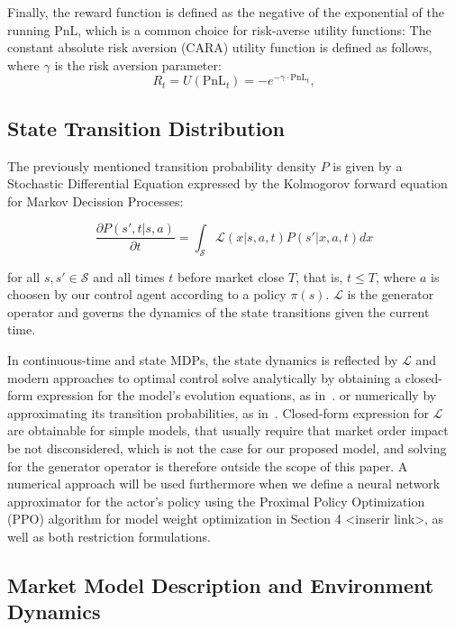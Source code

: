 Finally, the reward function is defined as the negative of the exponential of the running PnL, which is a common choice for risk-averse utility functions:
The constant absolute risk aversion (CARA) utility function is defined as follows, where \( \gamma \) is the risk aversion parameter:
\[
    R_t = U(\text{PnL}_t) = -e^{-\gamma \cdot \text{PnL}_t},
\]

\subsection{State Transition Distribution}
\label{subsec:state-transition-distribution}

The previously mentioned transition probability density $P$ is given by a Stochastic Differential Equation expressed by the Kolmogorov forward equation for Markov Decission Processes:

\begin{equation}
    \label{eq:equation2}
    \frac{\partial P(s', t | s, a)}{\partial t}  = \int_{\mathcal{S}} \mathcal{L}(x | s, a, t) P(s'| x, a, t) dx
\end{equation}

for all $s, s' \in \mathcal{S}$ and all times $t$ before market close $T$, that is, $t \le T$,
where $a$ is choosen by our control agent according to a policy $\pi (s)$.
$\mathcal{L}$ is the generator operator and governs the dynamics of the state transitions given the current time.

In continuous-time and state MDPs, the state dynamics is reflected by $\mathcal{L}$ and modern approaches to optimal control
solve analytically by obtaining a closed-form expression for the model's evolution equations, as in~\citet{Avellaneda2008, Gueant2017}.
or numerically by approximating its transition probabilities, as in~\citet{Gueant2022, Selser2021a, FalcesMarin2022}.
Closed-form expression for $\mathcal{L}$ are obtainable for simple models, that usually require that market order impact be not disconsidered,
which is not the case for our proposed model, and solving for the generator operator is therefore outside the scope of this paper.
A numerical approach will be used furthermore when we define a neural network approximator for the actor's policy using the
Proximal Policy Optimization (PPO) algorithm for model weight optimization in Section 4 <inserir link>, as well as both restriction formulations.

\subsection{Market Model Description and Environment Dynamics}
\label{subsec:market-model-description-and-environment-dynamics}

